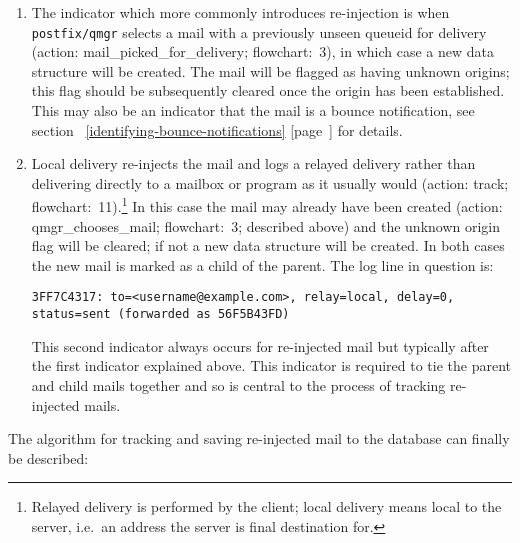 \documentclass[a4paper,12pt,draft]{article}
\newcommand{\refwithpage}[1]{%
    \empty{}\ref{#1} [page~\pageref{#1}]%
}
\begin{document}
\begin{enumerate}

    \item The indicator which more commonly introduces re-injection is when
        \texttt{postfix/qmgr} selects a mail with a previously unseen
        queueid for delivery (action: mail\_picked\_for\_delivery;
        flowchart:~3), in which case a new data structure will be created.
        The mail will be flagged as having unknown origins; this flag
        should be subsequently cleared once the origin has been
        established.  This may also be an indicator that the mail is a
        bounce notification, see
        section~\refwithpage{identifying-bounce-notifications} for details.

    \item Local delivery re-injects the mail and logs a relayed delivery
        rather than delivering directly to a mailbox or program as it
        usually would (action: track; flowchart:~11).\footnote{Relayed
        delivery is performed by the \SMTP{} client; local delivery means
        local to the server, i.e.\ an address the server is final
        destination for.} In this case the mail may already have been
        created (action: qmgr\_chooses\_mail; flowchart:~3; described
        above) and the unknown origin flag will be cleared; if not a new
        data structure will be created.  In both cases the new mail is
        marked as a child of the parent.  The log line in question is:

        \texttt{3FF7C4317: to=<username@example.com>, relay=local, \newline 
        delay=0, status=sent (forwarded as 56F5B43FD)}

        This second indicator always occurs for re-injected mail but
        typically after the first indicator explained above.  This
        indicator is required to tie the parent and child mails together
        and so is central to the process of tracking re-injected mails.

\end{enumerate}

The algorithm for tracking and saving re-injected mail to the database can
finally be described:
\end{document}
